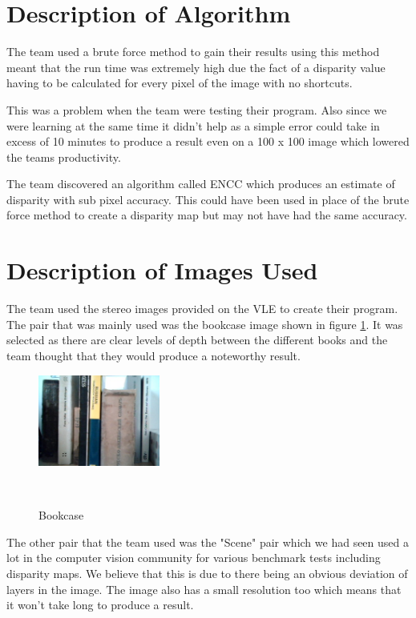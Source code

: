 \documentclass[twocolumn]{article}
\begin{document}
\section{Description of Algorithm}
\vspace{-1ex}

The team used a brute force method to gain their results using this method meant that the run time was extremely high due the fact of a disparity value having to be calculated for every pixel of the image with no shortcuts. 

This was a problem when the team were testing their program. Also since we were learning at the same time it didn't help as a simple error could take in excess of 10 minutes to produce a result even on a 100 x 100 image which lowered the teams productivity. 


The team discovered an algorithm called ENCC \cite{ENCC} which produces an estimate of disparity with sub pixel accuracy. This could have been used in place of the brute force method to create a disparity map but may not have had the same accuracy. 

\section{Description of Images Used}
\vspace{-1ex}

The team used the stereo images provided on the VLE to create their program. The pair that was mainly used was the bookcase image shown in figure \ref{fig:testR}. It was selected as there are clear levels of depth between the different books and the team thought that they would produce a noteworthy result. 

\begin{figure}[H]
\centering
  \includegraphics[width=40mm]{Figures/testR}
    \caption{Bookcase}~\label{fig:testR}
\end{figure} 

The other pair that the team used was the "Scene" pair which we had seen used a lot in the computer vision community \cite{sceneusage} \cite{sceneusage2} for various benchmark tests including disparity maps. We believe that this is due to there being an obvious deviation of layers in the image. The image also has a small resolution too which means that it won't take long to produce a result.  
\end{document}
